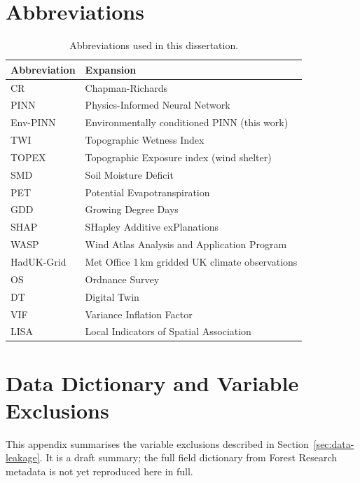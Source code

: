 \chapter{Abbreviations}
\label{app:abbreviations}

\begin{table}[h]
\centering
\begin{tabular}{ll}
\toprule
Abbreviation & Expansion \\
\midrule
CR & Chapman-Richards \\
PINN & Physics-Informed Neural Network \\
Env-PINN & Environmentally conditioned PINN (this work) \\
TWI & Topographic Wetness Index \\
TOPEX & Topographic Exposure index (wind shelter) \\
SMD & Soil Moisture Deficit \\
PET & Potential Evapotranspiration \\
GDD & Growing Degree Days \\
SHAP & SHapley Additive exPlanations \\
WASP & Wind Atlas Analysis and Application Program \\
HadUK-Grid & Met Office 1\,km gridded UK climate observations \\
OS & Ordnance Survey \\
DT & Digital Twin \\
VIF & Variance Inflation Factor \\
LISA & Local Indicators of Spatial Association \\
\bottomrule
\end{tabular}
\caption{Abbreviations used in this dissertation.}
\end{table}

\chapter{Data Dictionary and Variable Exclusions}
\label{app:data-dictionary}

This appendix summarises the variable exclusions described in Section~\ref{sec:data-leakage}. It is a draft summary; the full field dictionary from Forest Research metadata is not yet reproduced here in full.

